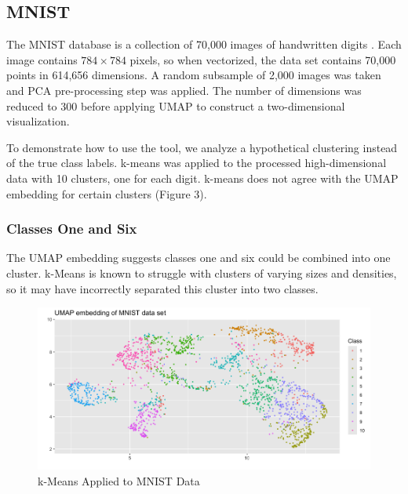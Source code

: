\documentclass{article}
\begin{document}
\subsection{MNIST}
The MNIST database is a collection of 70,000 images of handwritten digits \cite{MNIST}. Each image contains $784 \times 784$ pixels, so when vectorized, the data set contains 70,000 points in 614,656 dimensions. A random subsample of 2,000 images was taken and PCA pre-processing step was applied. The number of dimensions was reduced to 300 before applying UMAP to construct a two-dimensional visualization.

 To demonstrate how to use the tool, we analyze a hypothetical clustering instead of the true class labels. k-means was applied to the processed high-dimensional data with 10 clusters,  one for each digit. k-means does not agree with the UMAP embedding for certain clusters (Figure 3).
 
 \subsubsection{Classes One and Six}
 The UMAP embedding suggests classes one and six could be combined into one cluster. k-Means is known to struggle with clusters of varying sizes and densities, so it may have incorrectly separated this cluster into two classes.
 
 \renewcommand{\figurename}{Figure}
\renewcommand{\thefigure}{3}
\begin{figure}[!t]
\centering
\includegraphics[scale=0.43]{MNIST kmeans}
\caption{k-Means Applied to MNIST Data}
\end{figure}
 
\newpage
\end{document}
